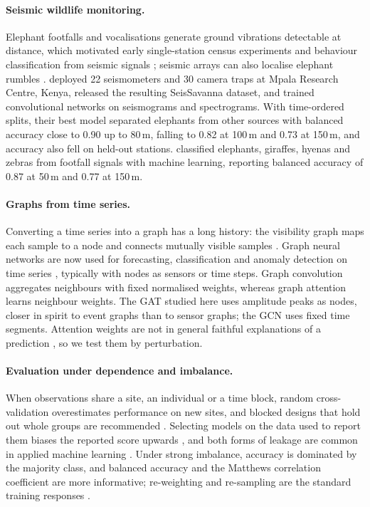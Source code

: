 \documentclass[a4paper,fleqn]{cas-dc}
\begin{document}
\paragraph{Seismic wildlife monitoring.}
Elephant footfalls and vocalisations generate ground vibrations detectable at
distance, which motivated early single-station census experiments
\citep{wood2005} and behaviour classification from seismic signals
\citep{mortimer2018}; seismic arrays can also localise elephant rumbles
\citep{reinwald2021}. \citet{szenicer2022} deployed 22 seismometers and 30 camera
traps at Mpala Research Centre, Kenya, released the resulting SeisSavanna dataset,
and trained convolutional networks on seismograms and spectrograms. With time-ordered
splits, their best model separated elephants from other sources with balanced
accuracy close to 0.90 up to 80\,m, falling to 0.82 at 100\,m and 0.73 at 150\,m, and
accuracy also fell on held-out stations. \citet{steinmann2025} classified elephants,
giraffes, hyenas and zebras from footfall signals with machine learning, reporting
balanced accuracy of 0.87 at 50\,m and 0.77 at 150\,m.

\paragraph{Graphs from time series.}
Converting a time series into a graph has a long history: the visibility graph maps
each sample to a node and connects mutually visible samples \citep{lacasa2008}. Graph
neural networks are now used for forecasting, classification and anomaly detection on
time series \citep{jin2024}, typically with nodes as sensors or time steps. Graph
convolution \citep{kipf2017} aggregates neighbours with fixed normalised weights,
whereas graph attention \citep{velickovic2018} learns neighbour weights. The GAT studied
here uses amplitude peaks as nodes, closer in spirit to event graphs than to sensor
graphs; the GCN uses fixed time segments. Attention weights are not in general faithful
explanations of a prediction \citep{jain2019}, so we test them by perturbation.

\paragraph{Evaluation under dependence and imbalance.}
When observations share a site, an individual or a time block, random cross-validation
overestimates performance on new sites, and blocked designs that hold out whole groups
are recommended \citep{roberts2017}. Selecting models on the data used to report them
biases the reported score upwards \citep{cawley2010}, and both forms of leakage are
common in applied machine learning \citep{kapoor2023}. Under strong imbalance, accuracy
is dominated by the majority class, and balanced accuracy \citep{brodersen2010} and the
Matthews correlation coefficient \citep{chicco2020} are more informative; re-weighting
and re-sampling are the standard training responses \citep{he2009}.
\end{document}
